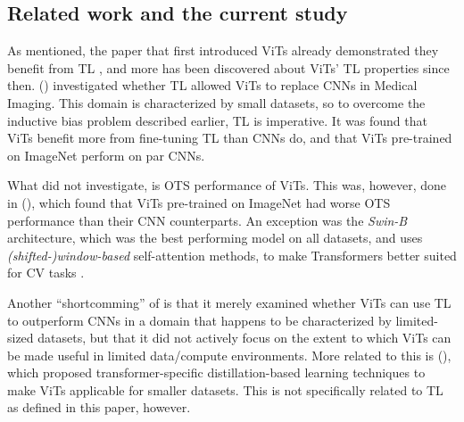 
\subsection{Related work and the current study}
As mentioned, the paper that first introduced ViTs already demonstrated they benefit from TL \citep{dosovitskiy2020image}, and more has been discovered about ViTs' TL properties since then. \citeauthor{matsoukas2021time} (\citeyear{matsoukas2021time}) investigated whether TL allowed ViTs to replace CNNs in Medical Imaging. This domain is characterized by small datasets, so to overcome the inductive bias problem described earlier, TL is imperative. It was found that ViTs benefit more from fine-tuning TL than CNNs do, and that ViTs pre-trained on ImageNet perform on par CNNs.

What \citeauthor{matsoukas2021time} did not investigate, is OTS performance of ViTs. This was, however, done in \citeauthor{zhou2021convnets} (\citeyear{zhou2021convnets}), which found that ViTs pre-trained on ImageNet had worse OTS performance than their CNN counterparts. An exception was the \textit{Swin-B} architecture, which was the best performing model on all datasets, and uses \textit{(shifted-)window-based} self-attention methods, to make Transformers better suited for CV tasks \citep{liu2021swin}.

Another ``shortcomming'' of \citeauthor{matsoukas2021time} is that it merely examined whether ViTs can use TL to outperform CNNs in a domain that happens to be characterized by limited-sized datasets, but that it did not actively focus on the extent to which ViTs can be made useful in limited data/compute environments. More related to this is \citeauthor{touvron2021training} (\citeyear{touvron2021training}), which proposed transformer-specific distillation-based learning techniques to make ViTs applicable for smaller datasets. This is not specifically related to TL as defined in this paper, however.





